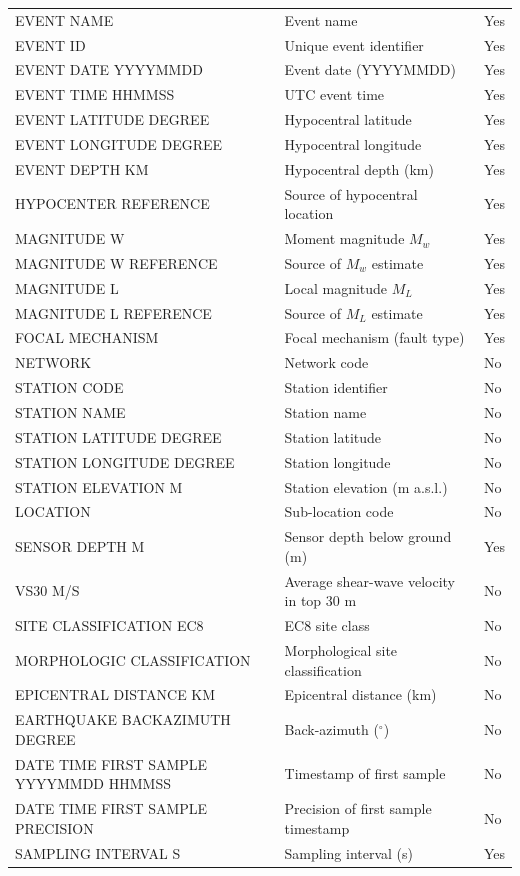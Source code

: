 \begin{longtable}{
  >{\raggedright\arraybackslash}p{4cm}  >{\raggedright\arraybackslash}p{8cm}  >{\centering\arraybackslash}p{2cm}
}
EVENT NAME & Event name & Yes \\
EVENT ID & Unique event identifier & Yes \\
EVENT DATE YYYYMMDD & Event date (YYYYMMDD) & Yes \\
EVENT TIME HHMMSS & UTC event time & Yes \\
EVENT LATITUDE DEGREE & Hypocentral latitude & Yes \\
EVENT LONGITUDE DEGREE & Hypocentral longitude & Yes \\
EVENT DEPTH KM & Hypocentral depth (km) & Yes \\
HYPOCENTER REFERENCE & Source of hypocentral location & Yes \\
MAGNITUDE W & Moment magnitude $M_w$ & Yes \\
MAGNITUDE W REFERENCE & Source of $M_w$ estimate & Yes \\
MAGNITUDE L & Local magnitude $M_L$ & Yes \\
MAGNITUDE L REFERENCE & Source of $M_L$ estimate & Yes \\
FOCAL MECHANISM & Focal mechanism (fault type) & Yes \\
NETWORK & Network code & No \\
STATION CODE & Station identifier & No \\
STATION NAME & Station name & No \\
STATION LATITUDE DEGREE & Station latitude & No \\
STATION LONGITUDE DEGREE & Station longitude & No \\
STATION ELEVATION M & Station elevation (m a.s.l.) & No \\
LOCATION & Sub-location code & No \\
SENSOR DEPTH M & Sensor depth below ground (m) & Yes \\
VS30 M/S & Average shear-wave velocity in top 30 m & No \\
SITE CLASSIFICATION EC8 & EC8 site class & No \\
MORPHOLOGIC CLASSIFICATION & Morphological site classification & No \\
EPICENTRAL DISTANCE KM & Epicentral distance (km) & No \\
EARTHQUAKE BACKAZIMUTH DEGREE & Back-azimuth ($^\circ$) & No \\
DATE TIME FIRST SAMPLE YYYYMMDD HHMMSS & Timestamp of first sample & No \\
DATE TIME FIRST SAMPLE PRECISION & Precision of first sample timestamp & No \\
SAMPLING INTERVAL S & Sampling interval (s) & Yes \\

\end{longtable}
